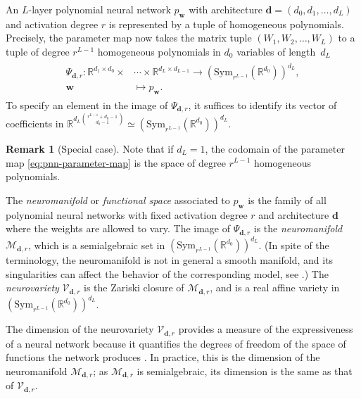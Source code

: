\documentclass[12pt]{article}
\theoremstyle{definition}
\newtheorem{remark}[theorem]{Remark}
\newcommand{\bw}{\mathbf{w}}
\newcommand{\demph}[1]{\emph{{\color{RoyalBlue}#1}}}
\begin{document}
An $L$-layer polynomial neural network $p_\bw$ with architecture $\mathbf{d} = (d_0,d_1,\dotsc,d_L)$ and activation degree $r$ is represented by a tuple of homogeneous polynomials. 
Precisely, the parameter map now takes the matrix tuple $(W_1,W_2,\dots, W_L)$ to a tuple of degree $r^{L-1}$ homogeneous polynomials in $d_0$ variables of length~$d_L$
\begin{align}\label{eq:pnn-parameter-map}
\begin{split}
    \Psi_{\mathbf{d},r}:\mathbb{R}^{d_1\times d_0}\times&\cdots\times\mathbb{R}^{d_L\times d_{L-1}}\to(\text{Sym}_{r^{L-1}}(\mathbb{R}^{d_0}))^{d_L},\\
    \bw&\mapsto p_\bw.
\end{split}
\end{align}
To specify an element in the image of $\Psi_{\mathbf{d},r}$, it suffices to identify its vector of coefficients in $\mathbb{R}^{d_L \binom{r^{L-1}+d_0-1}{d_0-1}}\simeq\left(\text{Sym}_{r^{L-1}}(\mathbb{R}^{d_0})\right)^{d_L}$.
 \begin{remark}[Special case]
     Note that if $d_L=1$, the codomain of the parameter map \eqref{eq:pnn-parameter-map} is the space of degree $r^{L-1}$ homogeneous polynomials. 
 \end{remark}


The \textit{neuromanifold} or \textit{functional space} associated to $p_{\mathbf{w}}$ is the family of all polynomial neural networks with fixed activation degree $r$ and architecture $\mathbf{d}$ 
where the weights are allowed to vary. The image of $\Psi_{\mathbf{d},r}$ is the \demph{neuromanifold} $\mathcal{M}_{\mathbf{d},r}$, which is a semialgebraic set in $(\text{Sym}_{r^{L-1}}(\mathbb{R}^{d_0}))^{d_L}$. (In spite of the terminology, the neuromanifold is not in general a smooth manifold, and its singularities can affect the behavior of the corresponding model, see \cite{Amari,marchetti2025invitationneuroalgebraicgeometry, shahverdi2024geometryoptimizationpolynomialconvolutional}.) The \demph{neurovariety} $\mathcal{V}_{\mathbf{d},r}$ is the Zariski closure of $\mathcal{M}_{\mathbf{d},r}$, and is a real affine variety in $(\text{Sym}_{r^{L-1}}(\mathbb{R}^{d_0}))^{d_L}$.

The dimension of the neurovariety $\mathcal{V}_{\mathbf{d},r}$ provides a measure of the expressiveness of a neural network because it quantifies the degrees of freedom of the space of functions the network produces \cite{KTB2019}. In practice, this is the dimension of the neuromanifold $\mathcal{M}_{\mathbf{d},r}$; as $\mathcal{M}_{\mathbf{d},r}$ is semialgebraic, its dimension is the same as that of $\mathcal{V}_{\mathbf{d},r}$.
\end{document}
